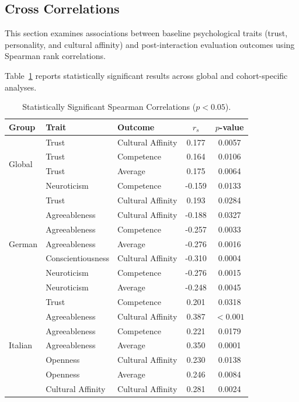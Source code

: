 \subsection{Cross Correlations}

This section examines associations between baseline psychological traits (trust, personality, and cultural affinity) and post-interaction evaluation outcomes using Spearman rank correlations.

Table~\ref{tab:meaningful_correlations} reports statistically significant results across global and cohort-specific analyses.

\begin{table}[!ht]
\centering
\begin{tabular}{lllcc}
\toprule
\textbf{Group} & \textbf{Trait} & \textbf{Outcome} & \textbf{$r_s$} & \textbf{$p$-value} \\
\midrule
\multirow{4}{*}{Global} 
 & Trust & Cultural Affinity & 0.177 & 0.0057 \\
 & Trust & Competence & 0.164 & 0.0106 \\
 & Trust & Average & 0.175 & 0.0064 \\
 & Neuroticism & Competence & -0.159 & 0.0133 \\
\midrule
\multirow{7}{*}{German} 
 & Trust & Cultural Affinity & 0.193 & 0.0284 \\
 & Agreeableness & Cultural Affinity & -0.188 & 0.0327 \\
 & Agreeableness & Competence & -0.257 & 0.0033 \\
 & Agreeableness & Average & -0.276 & 0.0016 \\
 & Conscientiousness & Cultural Affinity & -0.310 & 0.0004 \\
 & Neuroticism & Competence & -0.276 & 0.0015 \\
 & Neuroticism & Average & -0.248 & 0.0045 \\
\midrule
\multirow{7}{*}{Italian} 
 & Trust & Competence & 0.201 & 0.0318 \\
 & Agreeableness & Cultural Affinity & 0.387 & $<0.001$ \\
 & Agreeableness & Competence & 0.221 & 0.0179 \\
 & Agreeableness & Average & 0.350 & 0.0001 \\
 & Openness & Cultural Affinity & 0.230 & 0.0138 \\
 & Openness & Average & 0.246 & 0.0084 \\
 & Cultural Affinity & Cultural Affinity & 0.281 & 0.0024 \\
\bottomrule
\end{tabular}
\caption{Statistically Significant Spearman Correlations ($p < 0.05$).}
\label{tab:meaningful_correlations}
\end{table}

